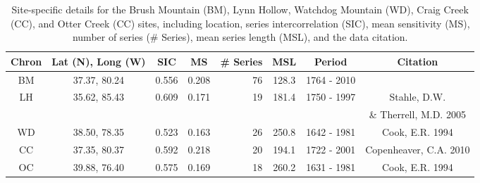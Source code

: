 \begin{landscape}
\begin{table}
\begin{center}
\begin{tabular}{ccccrccc} \toprule
Chron & Lat (N), Long (W) & SIC   & MS    & \# Series & MSL & Period      & Citation\\ \midrule
BM    &  37.37, 80.24 & 0.556 & 0.208 & 76        & 128.3              & 1764 - 2010 &         \\
LH    &  35.62, 85.43 & 0.609 & 0.171 & 19        & 181.4              & 1750 - 1997 &  Stahle, D.W.           \\
      &               &       &       &           &                    &             &  \& Therrell, M.D. 2005 \\
WD    &  38.50, 78.35 & 0.523 & 0.163 & 26        & 250.8              & 1642 - 1981 &  Cook, E.R. 1994  \\
CC    &  37.35, 80.37 & 0.592 & 0.218 & 20        & 194.1              & 1722 - 2001 &  Copenheaver, C.A. 2010 \\
OC    &  39.88, 76.40 & 0.575 & 0.169 & 18        & 260.2              & 1631 - 1981 &  Cook, E.R. 1994  \\
\bottomrule
\end{tabular}
\end{center}
\caption{Site-specific details for the Brush Mountain (BM), Lynn Hollow, Watchdog Mountain (WD), Craig Creek (CC), and Otter Creek (CC) sites, including location, series intercorrelation (SIC), mean sensitivity (MS), number of series (\# Series), mean series length (MSL), and the data citation. }
\label{table:chronStats}
\vspace{2cm}
\end{table}
\end{landscape}

